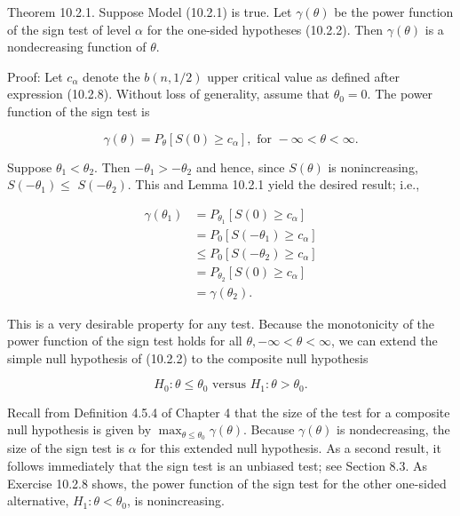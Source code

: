 Theorem 10.2.1. Suppose Model (10.2.1) is true. Let $\gamma(\theta)$ be the power function of the sign test of level $\alpha$ for the one-sided hypotheses (10.2.2). Then $\gamma(\theta)$ is a nondecreasing function of $\theta$.

Proof: Let $c_{\alpha}$ denote the $b(n, 1 / 2)$ upper critical value as defined after expression (10.2.8). Without loss of generality, assume that $\theta_{0}=0$. The power function of the sign test is

$$
\gamma(\theta)=P_{\theta}\left[S(0) \geq c_{\alpha}\right], \text { for }-\infty<\theta<\infty .
$$

Suppose $\theta_{1}<\theta_{2}$. Then $-\theta_{1}>-\theta_{2}$ and hence, since $S(\theta)$ is nonincreasing, $S\left(-\theta_{1}\right) \leq$ $S\left(-\theta_{2}\right)$. This and Lemma 10.2.1 yield the desired result; i.e.,

$$
\begin{aligned}
\gamma\left(\theta_{1}\right) & =P_{\theta_{1}}\left[S(0) \geq c_{\alpha}\right] \\
& =P_{0}\left[S\left(-\theta_{1}\right) \geq c_{\alpha}\right] \\
& \leq P_{0}\left[S\left(-\theta_{2}\right) \geq c_{\alpha}\right] \\
& =P_{\theta_{2}}\left[S(0) \geq c_{\alpha}\right] \\
& =\gamma\left(\theta_{2}\right) .
\end{aligned}
$$

This is a very desirable property for any test. Because the monotonicity of the power function of the sign test holds for all $\theta,-\infty<\theta<\infty$, we can extend the simple null hypothesis of (10.2.2) to the composite null hypothesis


\begin{equation*}
H_{0}: \theta \leq \theta_{0} \text { versus } H_{1}: \theta>\theta_{0} . \tag{10.2.11}
\end{equation*}


Recall from Definition 4.5.4 of Chapter 4 that the size of the test for a composite null hypothesis is given by $\max _{\theta \leq \theta_{0}} \gamma(\theta)$. Because $\gamma(\theta)$ is nondecreasing, the size of the sign test is $\alpha$ for this extended null hypothesis. As a second result, it follows immediately that the sign test is an unbiased test; see Section 8.3. As Exercise 10.2.8 shows, the power function of the sign test for the other one-sided alternative, $H_{1}: \theta<\theta_{0}$, is nonincreasing.

